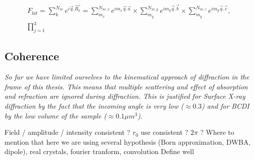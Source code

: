 \begin{gather}
    \label{eq:LatFactor}
    F_{lat} = \sum_k^{N_{uc}} e^{i\vec{q}.\vec{R_k}} = \sum_{m_x}^{N_{uc, x}} e^{i m_x\vec{q}.\vec{a}} \times \sum_{m_y}^{N_{uc, y}} e^{i m_y\vec{q}.\vec{b}} \times \sum_{m_y}^{N_{uc, z}} e^{i m_y\vec{q}.\vec{c}},\\
    \prod_{j=1}^3
\end{gather}

\subsection{Coherence}


\textit{
So far we have limited ourselves to the kinematical approach of diffraction in the frame of this thesis.
This means that multiple scattering and effect of absorption and refraction are ignored during diffraction.
This is justified for Surface X-ray diffraction by the fact that the incoming angle is very low ($\approx 0.3$) and for BCDI by the low volume of the sample ($\approx 0.1 \mu m^3$).
}

\textcolor{Important}{Field / amplitude / intensity consistent ? $r_0$ use consistent ? $2\pi$ ? Where to mention that here we are using several hypothesis (Born approximation, DWBA, dipole), real crystals, fourier tranform, convolution
Define well}
